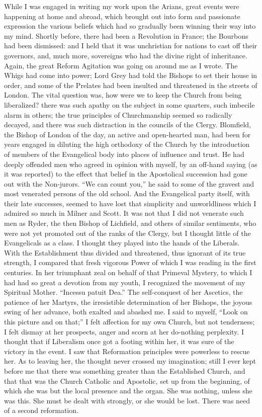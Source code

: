While I was engaged in writing my work upon the Arians, great
events were happening at home and abroad, which brought out into form
and passionate expression the various beliefs which had so gradually
been winning their way into my mind. Shortly before, there had been a
Revolution in France; the Bourbons had been dismissed: and I held that it was
unchristian for nations to cast off their governors, and, much more,
sovereigns who had the divine right of inheritance. Again, the great
Reform Agitation was going on around me as I wrote. The Whigs had come
into power; Lord Grey had told the Bishops to set their house in
order, and some of the Prelates had been insulted and threatened in
the streets of London. The vital question was, how were we to
keep the Church from being liberalized? there was such apathy on the
subject in some quarters, such imbecile alarm in others; the true
principles of Churchmanship seemed so radically decayed, and there was
such distraction in the councils of the Clergy. Blomfield, the Bishop of London of the
day, an active and open-hearted man, had been for years engaged in
diluting the high orthodoxy of the Church by the introduction of members of the Evangelical body into places of influence and
trust. He had deeply offended men who agreed in opinion with
myself, by an off-hand saying (as it was reported) to the effect that
belief in the Apostolical succession had gone out with the Non-jurors.
``We can count you,'' he said to some of the gravest and most
venerated persons of the old school. And the Evangelical party itself, with their late successes,
seemed to have lost that
simplicity and unworldliness which I admired so much in Milner and
Scott. It was not that I did not venerate such men as Ryder,
the then Bishop of Lichfield, and others of similar sentiments, who
were not yet promoted out of the ranks of the Clergy, but I thought
little of the Evangelicals as a
class. I thought they played into the hands of the Liberals. With the
Establishment thus divided and threatened, thus ignorant of its true
strength, I compared that fresh vigorous Power of which I was reading in the first centuries. In her
triumphant zeal on behalf of that Primeval Mystery, to which I had had
so great a devotion from my youth, I recognized the movement of my
Spiritual Mother. ``Incessu patuit Dea.'' The self-conquest of
her Ascetics, the patience of her Martyrs, the irresistible
determination of her Bishops, the joyous swing of her advance, both
exalted and abashed me. I said to myself, ``Look on this picture
and on that;'' I felt affection for my own Church, but not
tenderness; I felt dismay at her prospects, anger and scorn at her
do-nothing perplexity. I thought that if Liberalism once got a footing
within her, it was sure of the victory in the event. I saw that
Reformation principles were powerless to rescue her. As to leaving
her, the thought never crossed my imagination; still I ever kept
before me that there was something greater than the Established
Church, and that that was the Church Catholic and Apostolic, set up
from the beginning, of which she was but the local presence and the organ. She was nothing, unless she was this. She must be
dealt with strongly, or she would be lost. There was need of a second
reformation.

